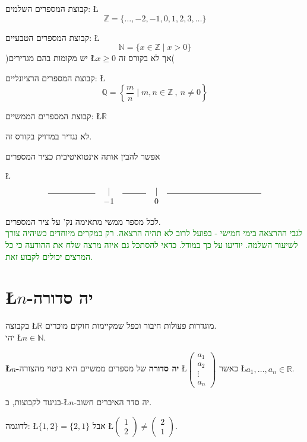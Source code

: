 \documentclass[english,hebrew]{article}
\begin{document}
קבוצת המספרים השלמים: \L{%
\[
\mathbb{Z}=\{\dots,-2,-1,0,1,2,3,\dots\}
\]
}%

קבוצת המספרים הטבעיים: \L{%
\[
\mathbb{N}=\{x\in\mathbb{Z}\mid x>0\}
\]
}%
)יש מקומות בהם מגדירים \L{$x\ge0$} אך לא בקורס זה(

קבוצת המספרים הרציונליים: \L{%
\[
\mathbb{Q}=\left\{ \frac{m}{n}\mid m,n\in\mathbb{Z}\ ,\ n\neq0\right\} 
\]
}%

קבוצת המספרים הממשיים: \L{$\mathbb{R}$}

לא נגדיר במדויק בקורס זה.

אפשר להבין אותה אינטואיטיבית כציר המספרים

\L{%
\[
\begin{array}{ccccc}
\rule{2cm}{0.5pt} & | & \rule{1cm}{0.5pt} & | & \rule{4cm}{0.5pt}\\
 & -1 &  & 0
\end{array}
\]
}%

לכל מספר ממשי מתאימה נק' על ציר המספרים. \\

\textcolor{green}{לגבי ההרצאה בימי חמישי - בפועל לרוב לא תהיה הרצאה.
רק במקרים מיוחדים כשיהיה צורך לשיעור השלמה. יודיעו על כך במודל. כדאי
להסתכל גם איזה מרצה שלח את ההודעה כי כל המרצים יכולים לקבוע זאת.}

\section{\L{$n$}-יה סדורה}

בקבוצה \L{$\mathbb{R}$} מוגדרות פעולות חיבור וכפל שמקיימות חוקים
מוכרים.\\

יהי \L{$n\in\mathbb{N}$}.

\textbf{\L{$n$}-יה סדורה} של מספרים ממשיים היא ביטוי מהצורה \L{$\begin{pmatrix}a_{1}\\
a_{2}\\
\vdots\\
a_{n}
\end{pmatrix}$} כאשר \L{$a_{1},\dots,a_{n}\in\mathbb{R}$}.

בניגוד לקבוצות, ב-\L{$n$}-יה סדר האיברים חשוב.

לדוגמה: \L{$\{1,2\}=\{2,1\}$} אבל \L{$\begin{pmatrix}1\\
2
\end{pmatrix}\neq\begin{pmatrix}2\\
1
\end{pmatrix}$}.
\end{document}
